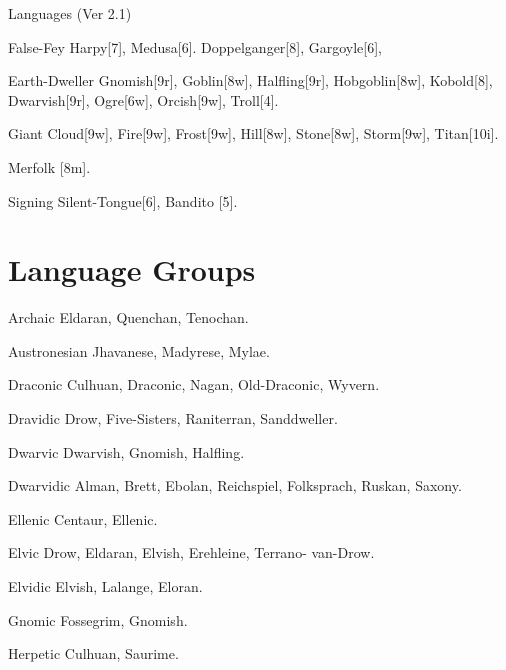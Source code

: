 \begin{Chapter}{Languages (Ver 2.1)}
\begin{Description}
\item[False-Fey] Harpy[7], Medusa[6].  Doppelganger[8], Gargoyle[6],

\item[Earth-Dweller] Gnomish[9r], Goblin[8w], Halfling[9r],
  Hobgoblin[8w], Kobold[8], Dwarvish[9r], Ogre[6w], Orcish[9w],
  Troll[4].

\item[Giant] Cloud[9w], Fire[9w], Frost[9w], Hill[8w], Stone[8w],
  Storm[9w], Titan[10i].

\item[Merfolk] [8m]. 

\item[Signing] Silent-Tongue[6], Bandito [5]. 
  
\end{Description}

\section{Language Groups}

\begin{Description}

\item[Archaic] Eldaran, Quenchan, Tenochan.

\item[Austronesian] Jhavanese, Madyrese, Mylae. 

\item[Draconic] Culhuan, Draconic, Nagan, Old-Draconic, Wyvern.

\item[Dravidic] Drow, Five-Sisters, Raniterran, Sanddweller.

\item[Dwarvic] Dwarvish, Gnomish, Halfling.

\item[Dwarvidic] Alman, Brett, Ebolan, Reichspiel, Folksprach, Ruskan,
  Saxony.

\item[Ellenic] Centaur, Ellenic.

\item[Elvic] Drow, Eldaran, Elvish, Erehleine, Terrano- van-Drow.

\item[Elvidic] Elvish, Lalange, Eloran.  

\item[Gnomic] Fossegrim, Gnomish.  

\item[Herpetic] Culhuan, Saurime. 


\end{Description}
\end{Chapter}
